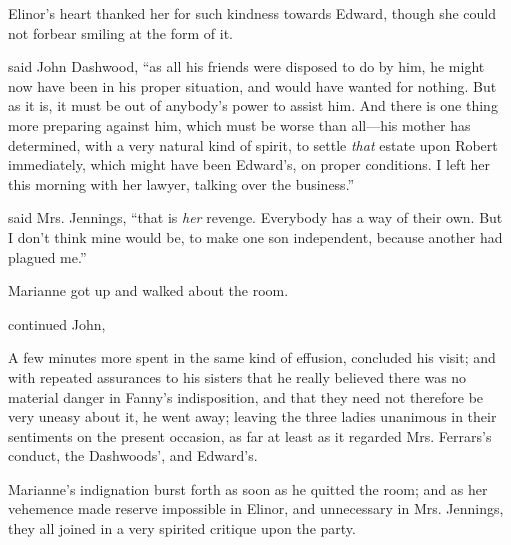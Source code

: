 Elinor's heart thanked her for such kindness towards Edward, though she could not forbear smiling at the form of it.

 said John Dashwood, “as all his friends were disposed to do by him, he might now have been in his proper situation, and would have wanted for nothing. But as it is, it must be out of anybody's power to assist him. And there is one thing more preparing against him, which must be worse than all---his mother has determined, with a very natural kind of spirit, to settle {\em that} estate upon Robert immediately, which might have been Edward's, on proper conditions. I left her this morning with her lawyer, talking over the business.”

 said Mrs. Jennings, “that is {\em her} revenge. Everybody has a way of their own. But I don't think mine would be, to make one son independent, because another had plagued me.”

Marianne got up and walked about the room.

 continued John, 

A few minutes more spent in the same kind of effusion, concluded his visit; and with repeated assurances to his sisters that he really believed there was no material danger in Fanny's indisposition, and that they need not therefore be very uneasy about it, he went away; leaving the three ladies unanimous in their sentiments on the present occasion, as far at least as it regarded Mrs. Ferrars's conduct, the Dashwoods', and Edward's.

Marianne's indignation burst forth as soon as he quitted the room; and as her vehemence made reserve impossible in Elinor, and unnecessary in Mrs. Jennings, they all joined in a very spirited critique upon the party.

\chapter{} %

